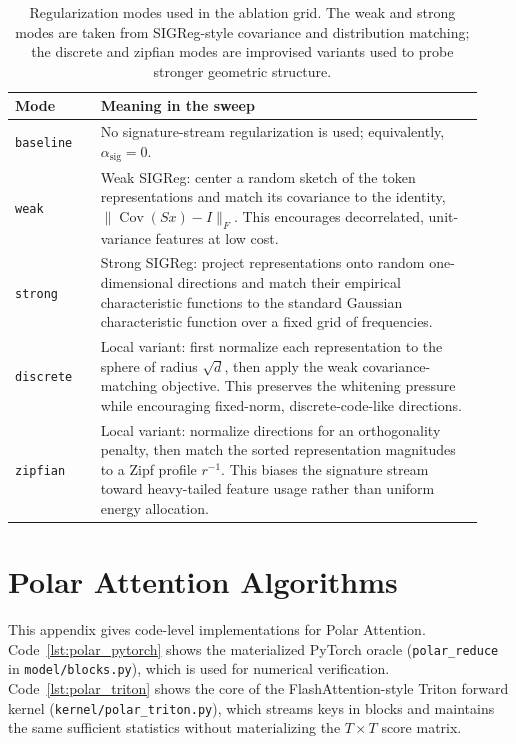 \documentclass{article} %
\begin{document}
\begin{table}[!ht]
\centering
\small
\begin{tabular}{p{0.17\linewidth}p{0.76\linewidth}}
\toprule
\textbf{Mode} & \textbf{Meaning in the sweep} \\
\midrule
\texttt{baseline} & No signature-stream regularization is used; equivalently, $\alpha_{\mathrm{sig}}=0$. \\
\texttt{weak} & Weak SIGReg: center a random sketch of the token representations and match its covariance to the identity, $\lVert \operatorname{Cov}(Sx)-I\rVert_F$. This encourages decorrelated, unit-variance features at low cost. \\
\texttt{strong} & Strong SIGReg: project representations onto random one-dimensional directions and match their empirical characteristic functions to the standard Gaussian characteristic function over a fixed grid of frequencies. \\
\texttt{discrete} & Local variant: first normalize each representation to the sphere of radius $\sqrt{d}$, then apply the weak covariance-matching objective. This preserves the whitening pressure while encouraging fixed-norm, discrete-code-like directions. \\
\texttt{zipfian} & Local variant: normalize directions for an orthogonality penalty, then match the sorted representation magnitudes to a Zipf profile $r^{-1}$. This biases the signature stream toward heavy-tailed feature usage rather than uniform energy allocation. \\
\bottomrule
\end{tabular}
\caption{Regularization modes used in the ablation grid. The weak and strong modes are taken from SIGReg-style covariance and distribution matching; the discrete and zipfian modes are improvised variants used to probe stronger geometric structure.}
\label{table:reg_modes}
\end{table}

\section{Polar Attention Algorithms}
\label{appendix:polar_algorithms}

This appendix gives code-level implementations for Polar Attention. Code~\ref{lst:polar_pytorch}
shows the materialized PyTorch oracle (\texttt{polar\_reduce} in \texttt{model/blocks.py}),
which is used for numerical verification. Code~\ref{lst:polar_triton} shows the core of the
FlashAttention-style Triton forward kernel (\texttt{kernel/polar\_triton.py}), which streams
keys in blocks and maintains the same sufficient statistics without materializing the
$T \times T$ score matrix.
\end{document}
